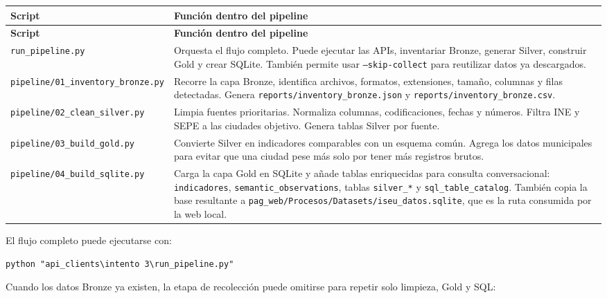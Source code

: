 \begin{longtable}{>{\raggedright\arraybackslash}p{} >{\raggedright\arraybackslash}p{}}
\toprule
\textbf{Script} & \textbf{Función dentro del pipeline} \\
\midrule
\endfirsthead
\toprule
\textbf{Script} & \textbf{Función dentro del pipeline} \\
\midrule
\endhead
\texttt{run\_pipeline.py} & Orquesta el flujo completo. Puede ejecutar las APIs, inventariar Bronze, generar Silver, construir Gold y crear SQLite. También permite usar \texttt{--skip-collect} para reutilizar datos ya descargados. \\
\texttt{pipeline/01\_}\newline\texttt{inventory\_bronze.py} & Recorre la capa Bronze, identifica archivos, formatos, extensiones, tamaño, columnas y filas detectadas. Genera \texttt{reports/inventory\_bronze.json} y \texttt{reports/inventory\_bronze.csv}. \\
\texttt{pipeline/02\_}\newline\texttt{clean\_silver.py} & Limpia fuentes prioritarias. Normaliza columnas, codificaciones, fechas y números. Filtra INE y SEPE a las ciudades objetivo. Genera tablas Silver por fuente. \\
\texttt{pipeline/03\_}\newline\texttt{build\_gold.py} & Convierte Silver en indicadores comparables con un esquema común. Agrega los datos municipales para evitar que una ciudad pese más solo por tener más registros brutos. \\
\texttt{pipeline/04\_}\newline\texttt{build\_sqlite.py} & Carga la capa Gold en SQLite y añade tablas enriquecidas para consulta conversacional: \texttt{indicadores}, \texttt{semantic\_observations}, tablas \texttt{silver\_*} y \texttt{sql\_table\_catalog}. También copia la base resultante a \texttt{pag\_web/Procesos/Datasets/}\newline\texttt{iseu\_datos.sqlite}, que es la ruta consumida por la web local. \\
\bottomrule
\end{longtable}

El flujo completo puede ejecutarse con:

\begin{verbatim}
python "api_clients\intento 3\run_pipeline.py"
\end{verbatim}

Cuando los datos Bronze ya existen, la etapa de recolección puede omitirse para repetir solo limpieza, Gold y SQL:

